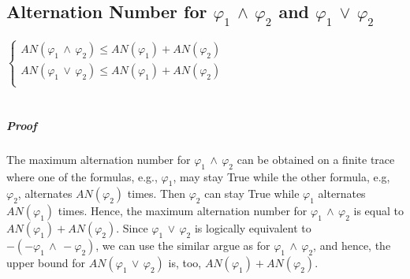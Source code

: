 \subsection{Alternation Number for $\varphi_1 \, \wedge \, \varphi_2$  and $\varphi_1 \, \vee \, \varphi_2$}



\begin{theorem}

$
 \left. 
\begin{cases} 
 AN(\varphi_1 \, \wedge \, \varphi_2) \leq AN(\varphi_1) + AN(\varphi_2) \\ 
 AN(\varphi_1 \, \vee \, \varphi_2) \leq AN(\varphi_1) + AN(\varphi_2)\\
\end{cases}\right. $  \\  \\

\end{theorem}

\subparagraph{Proof}

The maximum alternation number for $\varphi_1 \, \wedge \, \varphi_2$  can be obtained on a finite trace where one of the formulas, e.g., $\varphi_1$, may stay True while the other formula, e.g, $\varphi_2$, alternates $AN(\varphi_2)$ times. Then $\varphi_2$ can stay True while $\varphi_1$ alternates $AN(\varphi_1)$ times. Hence, the maximum alternation number for $\varphi_1 \, \wedge \, \varphi_2$ is equal to $AN(\varphi_1) + AN(\varphi_2)$. 
Since $\varphi_1 \, \vee \, \varphi_2$ is logically equivalent to $ - ( -\varphi_1 \, \wedge \, -\varphi_2)$, we can use the similar argue as for $\varphi_1 \, \wedge \, \varphi_2$, and hence, the upper bound for $AN(\varphi_1 \, \vee \, \varphi_2) $ is, too, $AN(\varphi_1) + AN(\varphi_2)$.





